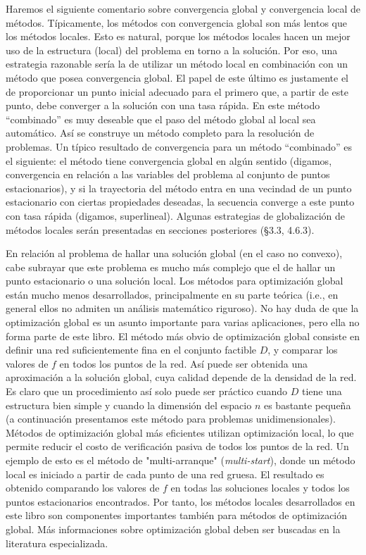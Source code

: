 Haremos el siguiente comentario sobre convergencia global y convergencia local de métodos. Típicamente, los métodos con convergencia global son más lentos que los métodos locales. Esto es natural, porque los métodos locales hacen un mejor uso de la estructura (local) del problema en torno a la solución. Por eso, una estrategia razonable sería la de utilizar un método local en combinación con un método que posea convergencia global. El papel de este último es justamente el de proporcionar un punto inicial adecuado para el primero que, a partir de este punto, debe converger a la solución con una tasa rápida. En este método ``combinado'' es muy deseable que el paso del método global al local sea automático. Así se construye un método completo para la resolución de problemas. Un típico resultado de convergencia para un método ``combinado'' es el siguiente: el método tiene convergencia global en algún sentido (digamos, convergencia en relación a las variables del problema al conjunto de puntos estacionarios), y si la trayectoria del método entra en una vecindad de un punto estacionario con ciertas propiedades deseadas, la secuencia converge a este punto con tasa rápida (digamos, superlineal). Algunas estrategias de globalización de métodos locales serán presentadas en secciones posteriores (\S 3.3, 4.6.3).

En relación al problema de hallar una solución global (en el caso no convexo), cabe subrayar que este problema es mucho más complejo que el de hallar un punto estacionario o una solución local. Los métodos para optimización global están mucho menos desarrollados, principalmente en su parte teórica (i.e., en general ellos no admiten un análisis matemático riguroso). No hay duda de que la optimización global es un asunto importante para varias aplicaciones, pero ella no forma parte de este libro. El método más obvio de optimización global consiste en definir una red suficientemente fina en el conjunto factible $D$, y comparar los valores de $f$ en todos los puntos de la red. Así puede ser obtenida una aproximación a la solución global, cuya calidad depende de la densidad de la red. Es claro que un procedimiento así solo puede ser práctico cuando $D$ tiene una estructura bien simple y cuando la dimensión del espacio $n$ es bastante pequeña (a continuación presentamos este método para problemas unidimensionales). Métodos de optimización global más eficientes utilizan optimización local, lo que permite reducir el costo de verificación pasiva de todos los puntos de la red. Un ejemplo de esto es el método de "multi-arranque" (\textit{multi-start}), donde un método local es iniciado a partir de cada punto de una red gruesa. El resultado es obtenido comparando los valores de $f$ en todas las soluciones locales y todos los puntos estacionarios encontrados. Por tanto, los métodos locales desarrollados en este libro son componentes importantes también para métodos de optimización global. Más informaciones sobre optimización global deben ser buscadas en la literatura especializada.

